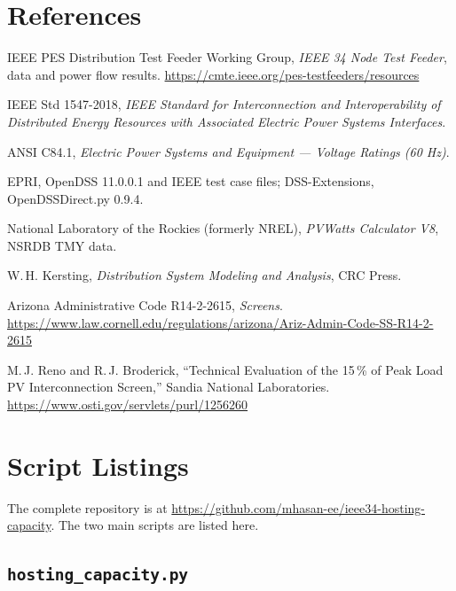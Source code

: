 \documentclass[11pt,letterpaper]{article}
\begin{document}
\section*{References}
\begin{enumerate}[label={[\arabic*]}]
  \item IEEE PES Distribution Test Feeder Working Group, \emph{IEEE 34 Node Test Feeder}, data and power flow
        results. \url{https://cmte.ieee.org/pes-testfeeders/resources}
  \item IEEE Std 1547-2018, \emph{IEEE Standard for Interconnection and Interoperability of Distributed Energy
        Resources with Associated Electric Power Systems Interfaces}.
  \item ANSI C84.1, \emph{Electric Power Systems and Equipment --- Voltage Ratings (60 Hz)}.
  \item EPRI, OpenDSS 11.0.0.1 and IEEE test case files; DSS-Extensions, OpenDSSDirect.py 0.9.4.
  \item National Laboratory of the Rockies (formerly NREL), \emph{PVWatts Calculator V8}, NSRDB TMY data.
  \item W.\,H. Kersting, \emph{Distribution System Modeling and Analysis}, CRC Press.
  \item Arizona Administrative Code R14-2-2615, \emph{Screens}.
        \url{https://www.law.cornell.edu/regulations/arizona/Ariz-Admin-Code-SS-R14-2-2615}
  \item M.\,J. Reno and R.\,J. Broderick, ``Technical Evaluation of the 15\,\% of Peak Load PV Interconnection
        Screen,'' Sandia National Laboratories. \url{https://www.osti.gov/servlets/purl/1256260}
\end{enumerate}

\appendix
\section{Script Listings}
The complete repository is at \url{https://github.com/mhasan-ee/ieee34-hosting-capacity}. The two main
scripts are listed here.

\subsection{\texttt{hosting\_capacity.py}}

\end{document}

